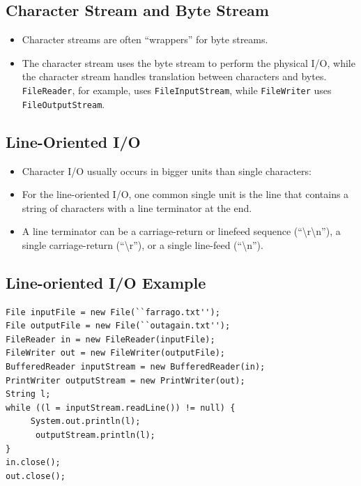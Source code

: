 \documentclass[11pt,a4paper]{article}
\begin{document}
\subsection*{Character Stream and Byte Stream}
\begin{itemize}
    \item Character streams are often ``wrappers'' for byte streams. 
    \item The character stream uses the byte stream to perform the physical I/O, while the character stream handles translation between characters and bytes. \texttt{FileReader}, for example, uses \texttt{FileInputStream}, while \texttt{FileWriter} uses \texttt{FileOutputStream}.
\end{itemize}
\subsection*{Line-Oriented I/O}
\begin{itemize}
    \item Character I/O usually occurs in bigger units than single characters: 
    \item For the line-oriented I/O, one common single unit is the line that contains a string of characters with a line terminator at the end. 
    \item A line terminator can be a carriage-return or linefeed sequence (``\textbackslash r\textbackslash n''), a single carriage-return (``\textbackslash r''), or a single line-feed (``\textbackslash n''). 
\end{itemize}

\subsection*{Line-oriented I/O Example}
\begin{lstlisting}[numbers=none]
File inputFile = new File(``farrago.txt''); 
File outputFile = new File(``outagain.txt''); 
FileReader in = new FileReader(inputFile); 
FileWriter out = new FileWriter(outputFile); 
BufferedReader inputStream = new BufferedReader(in); 
PrintWriter outputStream = new PrintWriter(out); 
String l; 
while ((l = inputStream.readLine()) != null) { 
     System.out.println(l); 
      outputStream.println(l); 
} 
in.close(); 
out.close(); 
\end{lstlisting}
\end{document}
